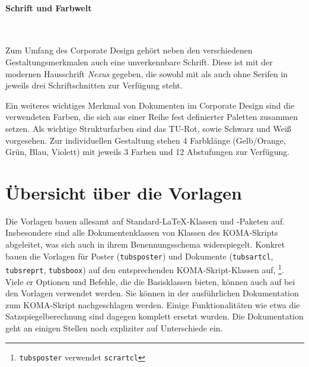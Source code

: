 \paragraph{Schrift und Farbwelt}\hfill\\
\begin{minipage}[t]{0.45\textwidth}
\vspace*{0pt}
\centering{}%
\end{minipage}
\begin{minipage}[t]{0.55\textwidth}
\vspace*{0pt}
Zum Umfang des Corporate Design gehört neben den verschiedenen
Gestaltungsmerkmalen auch eine unverkennbare Schrift.
Diese ist mit der modernen Hausschrift \emph{Nexus} gegeben, die sowohl mit als auch
ohne Serifen in jeweils drei Schriftschnitten zur Verfügung steht.
%

Ein weiteres wichtiges Merkmal von Dokumenten im Corporate Design sind
die verwendeten Farben, die sich aus einer Reihe fest definierter Paletten
zusammen setzen.
%
Als wichtige Strukturfarben sind das TU-Rot, sowie Schwarz und Weiß vorgesehen.
Zur individuellen Gestaltung stehen 4 Farbklänge (Gelb/Orange, Grün, Blau, Violett)
mit jeweils 3 Farben und 12 Abstufungen zur Verfügung.
%
\end{minipage}

\clearpage
\section{Übersicht über die Vorlagen}

Die Vorlagen bauen allesamt auf Standard-\LaTeX-Klassen und -Paketen auf.
Insbesondere sind alle Dokumentenklassen von Klassen des KOMA-Skripts
abgeleitet, was sich auch in ihrem Benennungsschema widerspiegelt.
Konkret bauen die Vorlagen für Poster (\texttt{tubsposter}) und Dokumente
(\texttt{tubsartcl}, \texttt{tubsreprt}, \texttt{tubsboox}) auf
den entsprechenden KOMA-Skript-Klassen auf,%
\footnote{\texttt{tubsposter} verwendet \texttt{scrartcl}}.
Viele er Optionen und Befehle, die die Basisklassen bieten, können auch
auf bei den Vorlagen verwendet werden.
Sie können in der ausführlichen Dokumentation zum KOMA-Skript\cite{koma-skript}
nachgeschlagen werden.
Einige Funktionalitäten wie etwa die Satzspiegelberechnung sind dagegen
komplett ersetzt wurden.
Die Dokumentation geht an einigen Stellen noch expliziter auf Unterschiede ein.

